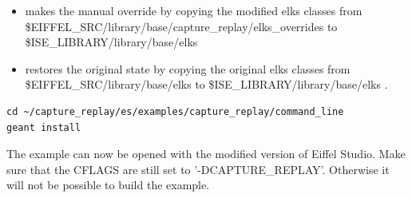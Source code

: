 \begin{itemize}
\item {} makes the manual override by copying the modified elks classes from \$EIFFEL\_SRC/library/base/capture\_replay/elks\_overrides to \$ISE\_LIBRARY/library/base/elks \\
\item {} restores the original state by copying the original elks classes from \$EIFFEL\_SRC/library/base/elks to \$ISE\_LIBRARY/library/base/elks .
\end{itemize}

\begin{lstlisting}
cd ~/capture_replay/es/examples/capture_replay/command_line
geant install
\end{lstlisting}

The example can now be opened with the modified version of Eiffel Studio. Make sure that the CFLAGS are still set to '-DCAPTURE\_REPLAY'. Otherwise it will not be possible to build the example.

\fussy